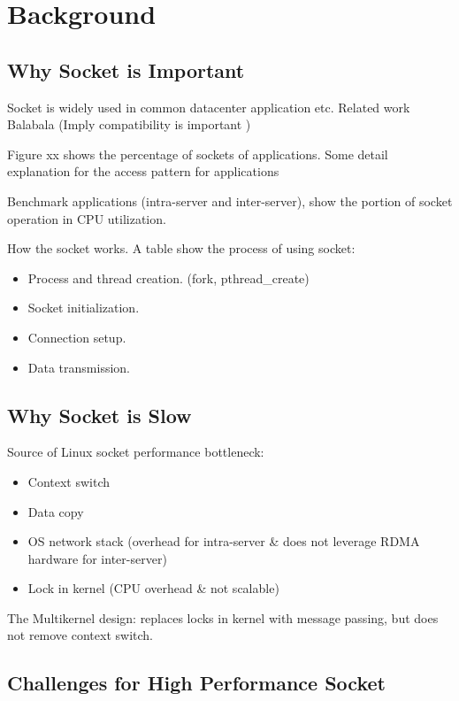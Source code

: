 \section{Background}
\label{sec:background}

\subsection{Why Socket is Important}

Socket is widely used in common datacenter application etc. Related work Balabala (Imply compatibility is important )

Figure xx shows the percentage of sockets of applications. Some detail explanation for the access pattern for applications

Benchmark applications (intra-server and inter-server), show the portion of socket operation in CPU utilization.

How the socket works. A table show the process of using socket:

\begin{itemize}
	\item Process and thread creation. (fork, pthread\_create)
	\item Socket initialization.
	\item Connection setup.
	\item Data transmission.
\end{itemize}


\subsection{Why Socket is Slow}
Source of Linux socket performance bottleneck:
\begin{itemize}
	\item Context switch
	\item Data copy
	\item OS network stack (overhead for intra-server \& does not leverage RDMA hardware for inter-server)
	\item Lock in kernel (CPU overhead \& not scalable)
\end{itemize}

The Multikernel design: replaces locks in kernel with message passing, but does not remove context switch.

\subsection{Challenges for High Performance Socket}
\label{subsec:challenges}

